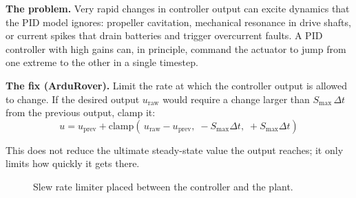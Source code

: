 \documentclass[12pt]{article}
\begin{document}
\textbf{The problem.}
Very rapid changes in controller output can excite dynamics that the PID
model ignores: propeller cavitation, mechanical resonance in drive shafts,
or current spikes that drain batteries and trigger overcurrent faults.
A PID controller with high gains can, in principle, command the actuator to
jump from one extreme to the other in a single timestep.

\textbf{The fix (ArduRover).}
Limit the rate at which the controller output is allowed to change.  If the
desired output $u_\mathrm{raw}$ would require a change larger than
$S_\mathrm{max}\,\Delta t$ from the previous output, clamp it:
\begin{equation}
  u = u_\mathrm{prev} + \mathrm{clamp}\!\left(\,u_\mathrm{raw} - u_\mathrm{prev},\;
      -S_\mathrm{max}\Delta t,\; +S_\mathrm{max}\Delta t\right)
\end{equation}

This does not reduce the ultimate steady-state value the output reaches; it
only limits how quickly it gets there.

\begin{figure}[htbp]
\centering
{}
\caption{Slew rate limiter placed between the controller and the plant.}
\label{fig:slewrate}
\end{figure}
\end{document}
